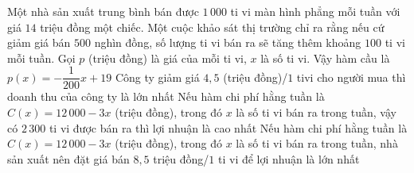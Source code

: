 \begin{ex}%
	Một nhà sản xuất trung bình bán được $1\,000$ ti vi màn hình phẳng mỗi tuần với giá $14$ triệu đồng một chiếc. Một cuộc khảo sát thị trường chỉ ra rằng nếu cứ  giảm giá bán $500$ nghìn đồng, số lượng ti vi bán ra sẽ tăng thêm khoảng $100$ ti vi mỗi tuần.
	 \choiceTF
		{\True Gọi $ p$ (triệu đồng) là giá của mỗi ti vi, $ x$  là số ti vi. Vậy hàm cầu là $ p(x)=-\dfrac{1}{200}x+19$}
		{\True Công ty giảm giá $ 4{,}5$ (triệu đồng)/$1$ tivi cho người mua thì doanh  thu của công ty là lớn nhất}
		{Nếu hàm  chi phí hằng tuần là $ C(x)=12\,000-3x$ (triệu đồng), trong đó $ x$ là số ti vi bán ra trong tuần, vậy có $2\,300$ ti vi được bán ra thì lợi nhuận là cao nhất}
		{Nếu hàm chi phí hằng tuần là $ C(x)=12\,000-3x$ (triệu đồng), trong đó $ x$ là số ti vi bán ra trong tuần, nhà sản xuất nên đặt giá bán $8{,}5$ triệu đồng/$1$ ti vi để lợi nhuận là  lớn nhất}
\end{ex}

